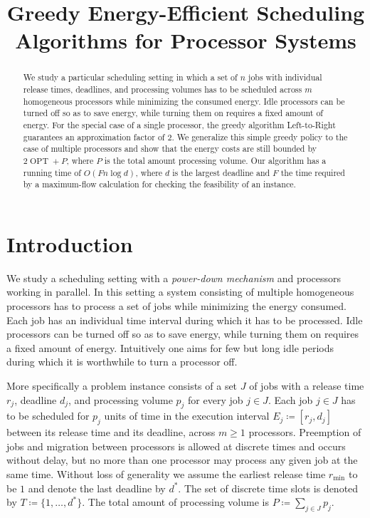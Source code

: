 \documentclass[a4paper]{article}
\title{Greedy Energy-Efficient Scheduling Algorithms for Processor Systems}
\DeclareMathOperator{\OPT}{OPT}
\begin{document}
%

\begin{abstract}
  We study a particular scheduling setting in which a set of $n$ jobs with individual release times, deadlines, and processing volumes has to be scheduled across $m$ homogeneous processors while minimizing the consumed energy.
  Idle processors can be turned off so as to save energy, while turning them on requires a fixed amount of energy.
  For the special case of a single processor, the greedy algorithm Left-to-Right guarantees an approximation factor of $2$.
  We generalize this simple greedy policy to the case of multiple processors and show that the energy costs are still bounded by $2 \OPT + P$, where $P$ is the total amount processing volume.
  Our algorithm has a running time of $O(F n \log d)$, where $d$ is the largest deadline and $F$ the time required by a maximum-flow calculation for checking the feasibility of an instance.
\end{abstract}

\tableofcontents

\section{Introduction}

We study a scheduling setting with a \emph{power-down mechanism} and processors working in parallel.
In this setting a system consisting of multiple homogeneous processors has to process a set of jobs while minimizing the energy consumed.
Each job has an individual time interval during which it has to be processed.
Idle processors can be turned off so as to save energy, while turning them on requires a fixed amount of energy.
Intuitively one aims for few but long idle periods during which it is worthwhile to turn a processor off.

More specifically a problem instance consists of a set $J$ of jobs with a release time $r_j$, deadline $d_j$, and processing volume $p_j$ for every job $j \in J$.
Each job $j \in J$ has to be scheduled for $p_j$ units of time in the execution interval $E_j \coloneqq [r_j, d_j]$ between its release time and its deadline, across $m \geq 1$ processors.
Preemption of jobs and migration between processors is allowed at discrete times and occurs without delay, but no more than one processor may process any given job at the same time.
Without loss of generality we assume the earliest release time $r_{\min}$ to be $1$ and denote the last deadline by $d^*$.
The set of discrete time slots is denoted by $T \coloneqq \{1, \ldots, d^*\}$.
The total amount of processing volume is $P \coloneqq \sum_{j \in J} p_j$.
\end{document}
